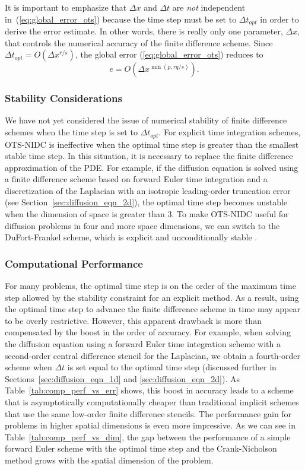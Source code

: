 \documentclass[fleqn,12pt,twoside]{article}
\newcommand{\beq}{\begin{equation}}
\newcommand{\eeq}{\end{equation}}
\def\dt{\Delta t}
\def\dx{\Delta x}
\def\dto{\dt_{opt}}
\begin{document}
It is important to emphasize that $\dx$ and $\dt$ are \emph{not} independent 
in~(\ref{eq:global_error_ots}) because the time step must be set to $\dto$ 
in order to derive the error estimate.  In other words, there is really only 
one parameter, $\dx$, that controls the numerical accuracy of the finite 
difference scheme.  Since $\dto = O(\dx^{r/s})$, the global error
(\ref{eq:global_error_ots}) reduces to
\beq
e = O \left( \dx^{\min(p,rq/s)} \right).
\label{eq:global_error_ots_simplified}
\eeq


\subsubsection*{Stability Considerations}
We have not yet considered the issue of numerical stability of finite
difference schemes when the time step is set to $\dto$.  For explicit time 
integration schemes, OTS-NIDC is ineffective when the optimal time step 
is greater than the smallest stable time step.  In this situation, it is 
necessary to replace the finite difference approximation of the PDE.  
For example, if the diffusion equation is solved using a 
finite difference scheme based on forward Euler time integration and a 
discretization of the Laplacian with an isotropic leading-order truncation 
error (see Section~\ref{sec:diffusion_eqn_2d}), the optimal time step becomes 
unstable when the dimension of space is greater than 3.  To make OTS-NIDC 
useful for diffusion problems in four and more space dimensions, we can switch 
to the DuFort-Frankel scheme, which is explicit and unconditionally 
stable \cite{gko_book}.


\subsubsection*{Computational Performance \label{sec:computational_performance}}
For many problems, the optimal time step is on the order of the maximum 
time step allowed by the stability constraint for an explicit method.  
As a result, using the optimal time step to advance the finite
difference scheme in time may appear to be overly restrictive.
However, this apparent drawback is more than 
compensated by the boost in the order of accuracy.  For example, when solving 
the diffusion equation using a forward Euler time integration scheme with a 
second-order central difference stencil for the Laplacian, we obtain a 
fourth-order scheme when $\dt$ is set equal to the optimal time step 
(discussed further in Sections~\ref{sec:diffusion_eqn_1d} and
\ref{sec:diffusion_eqn_2d}).  
As Table~\ref{tab:comp_perf_vs_err} shows, this boost in accuracy leads to a
scheme that is asymptotically computationally cheaper than traditional implicit
schemes that use the same low-order finite difference stencils.  The
performance gain for problems in higher spatial dimensions is even more
impressive.  As we can see in Table~\ref{tab:comp_perf_vs_dim}, the gap
between the performance of a simple forward Euler scheme with the optimal time
step and the Crank-Nicholson method grows with the spatial dimension of the
problem.  
\end{document}
